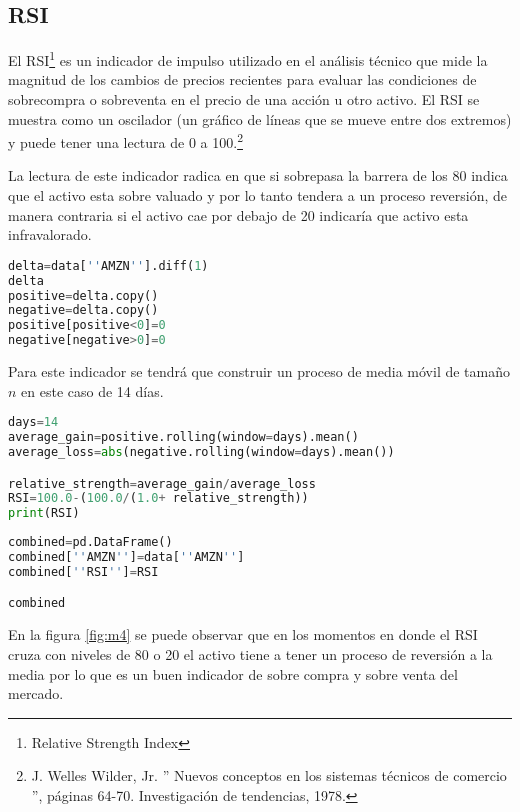\documentclass[letterpaper,12pt,oneside]{book}
\begin{document}
\subsection{RSI}

El RSI\footnote{Relative Strength Index} es un indicador de impulso utilizado en el análisis técnico que mide la magnitud de los cambios de precios recientes para evaluar las condiciones de sobrecompra o sobreventa en el precio de una acción u otro activo. El RSI se muestra como un oscilador (un gráfico de líneas que se mueve entre dos extremos) y puede tener una lectura de 0 a 100.\footnote{J. Welles Wilder, Jr. '' Nuevos conceptos en los sistemas técnicos de comercio '', páginas 64-70. Investigación de tendencias, 1978.}


La lectura de este indicador radica en que si sobrepasa la barrera de los 80 indica que el activo esta sobre valuado y por lo tanto tendera a un proceso reversión, de manera contraria si el activo cae por debajo de 20 indicaría que activo esta infravalorado.



\begin{lstlisting}[language=Python]
delta=data[''AMZN''].diff(1)
delta
positive=delta.copy()
negative=delta.copy()
positive[positive<0]=0
negative[negative>0]=0
\end{lstlisting}

Para este indicador se tendrá que construir un proceso de media móvil de tamaño $n$ en este caso de 14 días. 

\begin{lstlisting}[language=Python]
days=14
average_gain=positive.rolling(window=days).mean()
average_loss=abs(negative.rolling(window=days).mean())

relative_strength=average_gain/average_loss
RSI=100.0-(100.0/(1.0+ relative_strength))
print(RSI)
\end{lstlisting}


\begin{lstlisting}[language=Python]
combined=pd.DataFrame()
combined[''AMZN'']=data[''AMZN'']
combined[''RSI'']=RSI

combined
\end{lstlisting}

En la figura \ref{fig:m4} se puede observar que en los momentos en donde el RSI cruza con niveles de 80 o 20 el activo tiene a tener un proceso de reversión a la media por lo que es un buen indicador de sobre compra y sobre venta del mercado.
\end{document}
